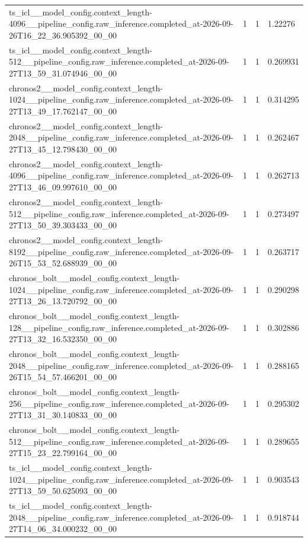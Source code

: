 \begin{tabular}{llll}
ts\_icl\_\_model\_config.context\_length-4096\_\_pipeline\_config.raw\_inference.completed\_at-2026-09-26T16\_22\_36.905392\_00\_00 & 1 & 1 & 1.22276 \\
ts\_icl\_\_model\_config.context\_length-512\_\_pipeline\_config.raw\_inference.completed\_at-2026-09-27T13\_59\_31.074946\_00\_00 & 1 & 1 & 0.269931 \\
chronos2\_\_model\_config.context\_length-1024\_\_pipeline\_config.raw\_inference.completed\_at-2026-09-27T13\_49\_17.762147\_00\_00 & 1 & 1 & 0.314295 \\
chronos2\_\_model\_config.context\_length-2048\_\_pipeline\_config.raw\_inference.completed\_at-2026-09-27T13\_45\_12.798430\_00\_00 & 1 & 1 & 0.262467 \\
chronos2\_\_model\_config.context\_length-4096\_\_pipeline\_config.raw\_inference.completed\_at-2026-09-27T13\_46\_09.997610\_00\_00 & 1 & 1 & 0.262713 \\
chronos2\_\_model\_config.context\_length-512\_\_pipeline\_config.raw\_inference.completed\_at-2026-09-27T13\_50\_39.303433\_00\_00 & 1 & 1 & 0.273497 \\
chronos2\_\_model\_config.context\_length-8192\_\_pipeline\_config.raw\_inference.completed\_at-2026-09-26T15\_53\_52.688939\_00\_00 & 1 & 1 & 0.263717 \\
chronos\_bolt\_\_model\_config.context\_length-1024\_\_pipeline\_config.raw\_inference.completed\_at-2026-09-27T13\_26\_13.720792\_00\_00 & 1 & 1 & 0.290298 \\
chronos\_bolt\_\_model\_config.context\_length-128\_\_pipeline\_config.raw\_inference.completed\_at-2026-09-27T13\_32\_16.532350\_00\_00 & 1 & 1 & 0.302886 \\
chronos\_bolt\_\_model\_config.context\_length-2048\_\_pipeline\_config.raw\_inference.completed\_at-2026-09-26T15\_54\_57.466201\_00\_00 & 1 & 1 & 0.288165 \\
chronos\_bolt\_\_model\_config.context\_length-256\_\_pipeline\_config.raw\_inference.completed\_at-2026-09-27T13\_31\_30.140833\_00\_00 & 1 & 1 & 0.295302 \\
chronos\_bolt\_\_model\_config.context\_length-512\_\_pipeline\_config.raw\_inference.completed\_at-2026-09-27T15\_23\_22.799164\_00\_00 & 1 & 1 & 0.289655 \\
ts\_icl\_\_model\_config.context\_length-1024\_\_pipeline\_config.raw\_inference.completed\_at-2026-09-27T13\_59\_50.625093\_00\_00 & 1 & 1 & 0.903543 \\
ts\_icl\_\_model\_config.context\_length-2048\_\_pipeline\_config.raw\_inference.completed\_at-2026-09-27T14\_06\_34.000232\_00\_00 & 1 & 1 & 0.918744 \\

\end{tabular}

